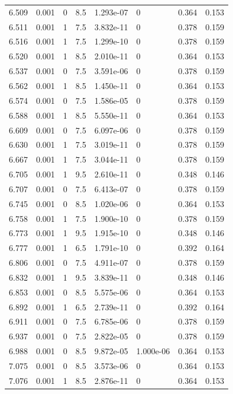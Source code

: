\documentclass[preview]{standalone}
\begin{document}
{{{{{\begin{tabular}{L{1.2cm}C{1.2cm} C{0.3cm}C{0.5cm} C{1.4cm}C{1.4cm} C{1.4cm}C{1.4cm}}
  6.509  &  0.001  & 0     & 8.5 &  1.293e-07  & 0  & 0.364 &  0.153   \\ 
  6.511  &  0.001  & 1     & 7.5 &  3.832e-11  & 0  & 0.378 &  0.159   \\ 
  6.516  &  0.001  & 1     & 7.5 &  1.299e-10  & 0  & 0.378 &  0.159   \\ 
  6.520  &  0.001  & 1     & 8.5 &  2.010e-11  & 0  & 0.364 &  0.153   \\ 
  6.537  &  0.001  & 0     & 7.5 &  3.591e-06  & 0  & 0.378 &  0.159   \\ 
  6.562  &  0.001  & 1     & 8.5 &  1.450e-11  & 0  & 0.364 &  0.153   \\ 
  6.574  &  0.001  & 0     & 7.5 &  1.586e-05  & 0  & 0.378 &  0.159   \\ 
  6.588  &  0.001  & 1     & 8.5 &  5.550e-11  & 0  & 0.364 &  0.153   \\ 
  6.609  &  0.001  & 0     & 7.5 &  6.097e-06  & 0  & 0.378 &  0.159   \\ 
  6.630  &  0.001  & 1     & 7.5 &  3.019e-11  & 0  & 0.378 &  0.159   \\ 
  6.667  &  0.001  & 1     & 7.5 &  3.044e-11  & 0  & 0.378 &  0.159   \\ 
  6.705  &  0.001  & 1     & 9.5 &  2.610e-11  & 0  & 0.348 &  0.146   \\ 
  6.707  &  0.001  & 0     & 7.5 &  6.413e-07  & 0  & 0.378 &  0.159   \\ 
  6.745  &  0.001  & 0     & 8.5 &  1.020e-06  & 0  & 0.364 &  0.153   \\ 
  6.758  &  0.001  & 1     & 7.5 &  1.900e-10  & 0  & 0.378 &  0.159   \\ 
  6.773  &  0.001  & 1     & 9.5 &  1.915e-10  & 0  & 0.348 &  0.146   \\ 
  6.777  &  0.001  & 1     & 6.5 &  1.791e-10  & 0  & 0.392 &  0.164   \\ 
  6.806  &  0.001  & 0     & 7.5 &  4.911e-07  & 0  & 0.378 &  0.159   \\ 
  6.832  &  0.001  & 1     & 9.5 &  3.839e-11  & 0  & 0.348 &  0.146   \\ 
  6.853  &  0.001  & 0     & 8.5 &  5.575e-06  & 0  & 0.364 &  0.153   \\ 
  6.892  &  0.001  & 1     & 6.5 &  2.739e-11  & 0  & 0.392 &  0.164   \\ 
  6.911  &  0.001  & 0     & 7.5 &  6.785e-06  & 0  & 0.378 &  0.159   \\ 
  6.937  &  0.001  & 0     & 7.5 &  2.822e-05  & 0  & 0.378 &  0.159   \\ 
  6.988  &  0.001  & 0     & 8.5 &  9.872e-05  & 1.000e-06  & 0.364 &  0.153   \\ 
  7.075  &  0.001  & 0     & 8.5 &  3.573e-06  & 0  & 0.364 &  0.153   \\ 
  7.076  &  0.001  & 1     & 8.5 &  2.876e-11  & 0  & 0.364 &  0.153   \\ 
\hline 
\end{tabular} 

}}}}}
\end{document}
